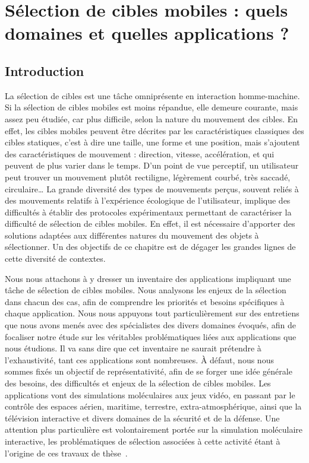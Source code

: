 
\chapter[Sélection de cibles mobiles : applications]{Sélection de cibles mobiles : quels domaines et quelles applications ?}

\minitoc
\label{chap1}
\clearpage

	\section{Introduction}
	La sélection de cibles est une tâche omniprésente en interaction homme-machine. Si la sélection de cibles mobiles est moins répandue, elle demeure courante, mais assez peu étudiée, car plus difficile, selon la nature du mouvement des cibles. En effet, les cibles mobiles peuvent être décrites par les caractéristiques classiques des cibles statiques, c'est à dire une taille, une forme et une position, mais s'ajoutent des caractéristiques de mouvement : direction, vitesse, accélération, et qui peuvent de plus varier dans le temps. D'un point de vue perceptif, un utilisateur peut trouver un mouvement plutôt rectiligne, légèrement courbé, très saccadé, circulaire\ldots{} La grande diversité des types de mouvements perçus, souvent reliés à des mouvements relatifs à l'expérience écologique de l'utilisateur, implique des difficultés à établir des protocoles expérimentaux permettant de caractériser la difficulté de sélection de cibles mobiles. En effet, il est nécessaire d'apporter des solutions adaptées aux différentes natures du mouvement des objets à sélectionner. Un des objectifs de ce chapitre est de dégager les grandes lignes de cette diversité de contextes.
	
	Nous nous attachons à y dresser un inventaire des applications impliquant une tâche de sélection de cibles mobiles. Nous analysons les enjeux de la sélection dans chacun des cas, afin de comprendre les priorités et besoins spécifiques à chaque application. Nous nous appuyons tout particulièrement sur des entretiens que nous avons menés avec des spécialistes des divers domaines évoqués, afin de focaliser notre étude sur les véritables problématiques liées aux applications que nous étudions. Il va sans dire que cet inventaire ne saurait prétendre à l'exhaustivité, tant ces applications sont nombreuses. À défaut, nous nous sommes fixés un objectif de représentativité, afin de se forger une idée générale des besoins, des difficultés et enjeux de la sélection de cibles mobiles. Les applications vont des simulations moléculaires aux jeux vidéo, en passant par le contrôle des espaces aérien, maritime, terrestre, extra-atmosphérique, ainsi que la télévision interactive et divers domaines de la sécurité et de la défense. Une attention plus particulière est volontairement portée sur la simulation moléculaire interactive, les problématiques de sélection associées à cette activité étant à l'origine de ces travaux de thèse~\cite{kouyoumdjian2014understanding, kouyoumdjian2015mdinvr}.
	

